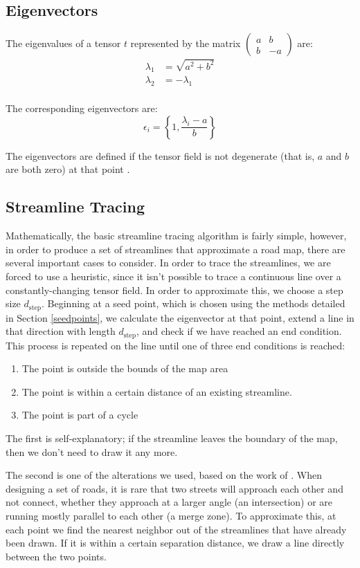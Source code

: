 \documentclass[twocolumn]{article}
\newcommand{\sqmat}[4]{\ensuremath{
    \left(\begin{array}{cc}
        #1 & #2 \\
        #3 & #4
    \end{array}\right)}}
\begin{document}
\subsection{Eigenvectors}
The eigenvalues of a tensor $t$ represented by the matrix $\sqmat{a}{b}{b}{-a}$
are:
\begin{align}
    \lambda_1 &= \sqrt{a^2+b^2} \\
    \lambda_2 &= -\lambda_1 \\
\end{align}

The corresponding eigenvectors are:
\[
    \epsilon_i = \left\{1,\frac{\lambda_i-a}{b}\right\}
\]

The eigenvectors are defined if the tensor field is not degenerate (that is,
$a$ and $b$ are both zero) at that point \cite{find-evs}.

\subsection{Streamline Tracing}
Mathematically, the basic streamline tracing algorithm is fairly simple,
however, in order to produce a set of streamlines that approximate a road map,
there are several important cases to consider. In order to trace the
streamlines, we are forced to use a heuristic, since it isn’t possible to trace
a continuous line over a constantly-changing tensor field. In order to
approximate this, we choose a step size $d_\textrm{step}$. Beginning at a seed
point, which is chosen using the methods detailed in Section \ref{seedpoints},
we calculate the eigenvector at that point, extend a line in that direction
with length $d_\textrm{step}$, and check if we have reached an end condition.
This process is repeated on the line until one of three end conditions is
reached:
\begin{enumerate}
    \item The point is outside the bounds of the map area
    \item The point is within a certain distance of an existing streamline.
    \item The point is part of a cycle
\end{enumerate}

The first is self-explanatory; if the streamline leaves the boundary of the
map, then we don’t need to draw it any more.

The second is one of the alterations we used, based on the work of \cite{chen}.
When designing a set of roads, it is rare that two streets will approach each
other and not connect, whether they approach at a larger angle (an
intersection) or are running mostly parallel to each other (a merge zone). To
approximate this, at each point we find the nearest neighbor out of the
streamlines that have already been drawn.  If it is within a certain separation
distance, we draw a line directly between the two points.
\end{document}

